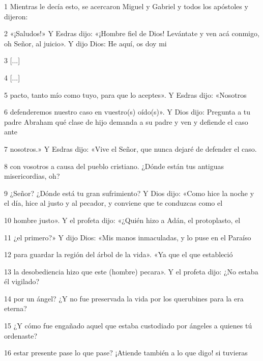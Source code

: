 \par 1 Mientras le decía esto, se acercaron Miguel y Gabriel y todos los apóstoles y dijeron:

\par 2 «¡Saludos!» Y Esdras dijo: «¡Hombre fiel de Dios! Levántate y ven acá conmigo, oh Señor, al juicio». Y dijo Dios: He aquí, os doy mi

\par 3 [...]

\par 4 [...]

\par 5 pacto, tanto mío como tuyo, para que lo aceptes». Y Esdras dijo: «Nosotros

\par 6 defenderemos nuestro caso en vuestro(s) oído(s)». Y Dios dijo: Pregunta a tu padre Abraham qué clase de hijo demanda a su padre y ven y defiende el caso ante

\par 7 nosotros.» Y Esdras dijo: «Vive el Señor, que nunca dejaré de defender el caso.

\par 8 con vosotros a causa del pueblo cristiano. ¿Dónde están tus antiguas misericordias, oh?

\par 9 ¿Señor? ¿Dónde está tu gran sufrimiento? Y Dios dijo: «Como hice la noche y el día, hice al justo y al pecador, y conviene que te conduzcas como el

\par 10 hombre justo». Y el profeta dijo: «¿Quién hizo a Adán, el protoplasto, el

\par 11 ¿el primero?» Y dijo Dios: «Mis manos inmaculadas, y lo puse en el Paraíso

\par 12 para guardar la región del árbol de la vida». «Ya que el que estableció

\par 13 la desobediencia hizo que este (hombre) pecara». Y el profeta dijo: ¿No estaba él vigilado?

\par 14 por un ángel? ¿Y no fue preservada la vida por los querubines para la era eterna?

\par 15 ¿Y cómo fue engañado aquel que estaba custodiado por ángeles a quienes tú ordenaste?

\par 16 estar presente pase lo que pase? ¡Atiende también a lo que digo! si tuvieras

